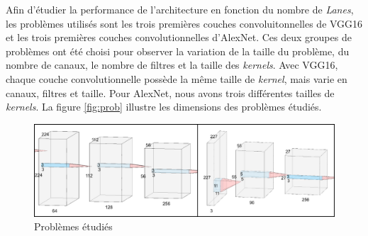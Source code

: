 \documentclass[10pt,letterpaper]{article}
\begin{document}
\begin{multicols}{2}
    Afin d'étudier la performance de l'architecture en fonction du nombre de \textit{Lanes}, les problèmes utilisés sont 
    les trois premières couches convoluitonnelles de VGG16 et les trois premières couches convolutionnelles d'AlexNet. 
    Ces deux groupes de problèmes ont été choisi pour observer la variation de la taille du problème, du nombre de canaux, 
    le nombre de filtres et la taille des \textit{kernels}. Avec VGG16, chaque couche convolutionnelle possède la même 
    taille de \textit{kernel}, mais varie en canaux, filtres et taille. Pour AlexNet, nous avons trois différentes tailles de \textit{kernels}.
    La figure \ref{fig:prob} illustre les dimensions des problèmes étudiés.
    
    \begin{figure}[H]
        \centering
        \includegraphics[width=\linewidth]{probs.png}
        \caption{Problèmes étudiés}
        \label{fig:probs}
    \end{figure}

    \end{multicols}
\end{document}
